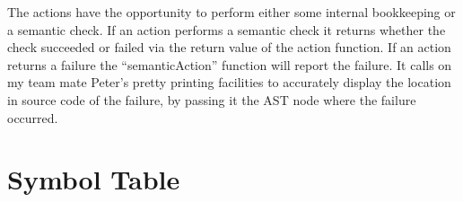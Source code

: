 \documentclass[oneside]{amsart}
\theoremstyle{definition}
\theoremstyle{remark}
\numberwithin{equation}{section}
\begin{document}
The actions have the opportunity to perform either some internal bookkeeping or a semantic check.
If an action performs a semantic check it returns whether the check succeeded or failed via the
return value of the action function. If an action returns a failure the ``semanticAction'' function
will report the failure. It calls on my team mate Peter's pretty printing facilities to accurately
display the location in source code of the failure, by passing it the AST node where the failure
occurred.

\section{Symbol Table}

\end{document}
